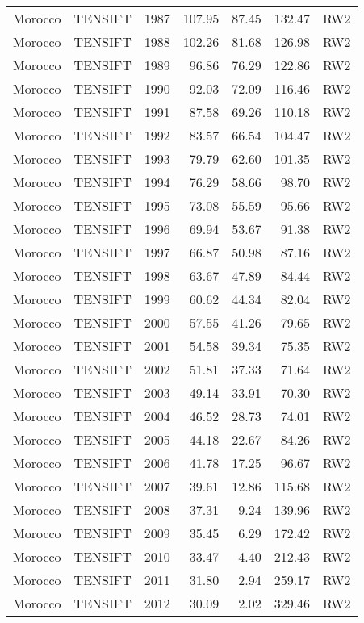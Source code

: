 \begin{longtable}{lllrrrl}
  Morocco & TENSIFT & 1987 & 107.95 & 87.45 & 132.47 & RW2 \\ 
  Morocco & TENSIFT & 1988 & 102.26 & 81.68 & 126.98 & RW2 \\ 
  Morocco & TENSIFT & 1989 & 96.86 & 76.29 & 122.86 & RW2 \\ 
  Morocco & TENSIFT & 1990 & 92.03 & 72.09 & 116.46 & RW2 \\ 
  Morocco & TENSIFT & 1991 & 87.58 & 69.26 & 110.18 & RW2 \\ 
  Morocco & TENSIFT & 1992 & 83.57 & 66.54 & 104.47 & RW2 \\ 
  Morocco & TENSIFT & 1993 & 79.79 & 62.60 & 101.35 & RW2 \\ 
  Morocco & TENSIFT & 1994 & 76.29 & 58.66 & 98.70 & RW2 \\ 
  Morocco & TENSIFT & 1995 & 73.08 & 55.59 & 95.66 & RW2 \\ 
  Morocco & TENSIFT & 1996 & 69.94 & 53.67 & 91.38 & RW2 \\ 
  Morocco & TENSIFT & 1997 & 66.87 & 50.98 & 87.16 & RW2 \\ 
  Morocco & TENSIFT & 1998 & 63.67 & 47.89 & 84.44 & RW2 \\ 
  Morocco & TENSIFT & 1999 & 60.62 & 44.34 & 82.04 & RW2 \\ 
  Morocco & TENSIFT & 2000 & 57.55 & 41.26 & 79.65 & RW2 \\ 
  Morocco & TENSIFT & 2001 & 54.58 & 39.34 & 75.35 & RW2 \\ 
  Morocco & TENSIFT & 2002 & 51.81 & 37.33 & 71.64 & RW2 \\ 
  Morocco & TENSIFT & 2003 & 49.14 & 33.91 & 70.30 & RW2 \\ 
  Morocco & TENSIFT & 2004 & 46.52 & 28.73 & 74.01 & RW2 \\ 
  Morocco & TENSIFT & 2005 & 44.18 & 22.67 & 84.26 & RW2 \\ 
  Morocco & TENSIFT & 2006 & 41.78 & 17.25 & 96.67 & RW2 \\ 
  Morocco & TENSIFT & 2007 & 39.61 & 12.86 & 115.68 & RW2 \\ 
  Morocco & TENSIFT & 2008 & 37.31 & 9.24 & 139.96 & RW2 \\ 
  Morocco & TENSIFT & 2009 & 35.45 & 6.29 & 172.42 & RW2 \\ 
  Morocco & TENSIFT & 2010 & 33.47 & 4.40 & 212.43 & RW2 \\ 
  Morocco & TENSIFT & 2011 & 31.80 & 2.94 & 259.17 & RW2 \\ 
  Morocco & TENSIFT & 2012 & 30.09 & 2.02 & 329.46 & RW2 \\ 

\end{longtable}
